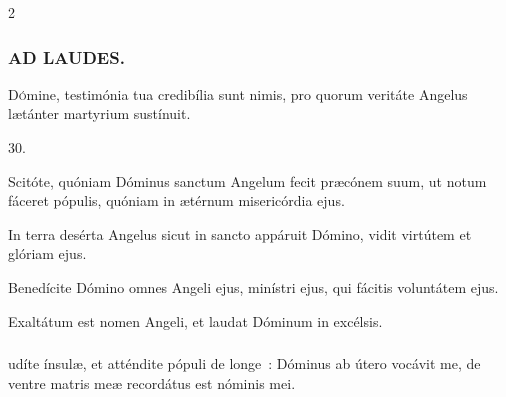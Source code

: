 \documentclass[9pt,twoside]{extarticle}
\begin{document}
\begin{multicols}{2}
{\subsubsection*{\center \textsc{AD LAUDES.}}
\begin{center}\end{center}
\lettrine{D}ómine, testimónia tua credibília sunt nimis, pro quorum veritáte Angelus lætánter martyrium sustínuit.

\begin{tightlist}{}
\item {} 30.
\item {} Scitóte, quóniam Dóminus sanctum Angelum fecit præcónem suum, ut notum fáceret pópulis, quóniam in ætérnum misericórdia ejus.
\item {} In terra desérta Angelus sicut in sancto appáruit Dómino, vidit virtútem et glóriam ejus.
\item {} Benedícite Dómino omnes Angeli ejus, minístri ejus, qui fácitis voluntátem ejus.
\item {} Exaltátum est nomen Angeli, et laudat Dóminum in excélsis.
\end{tightlist}

\subsubsection*{}
udíte ínsulæ, et atténdite pópuli de longe~: Dóminus ab útero vocávit me, de ventre matris meæ recordátus est nóminis mei.

}
\end{multicols}
\end{document}
